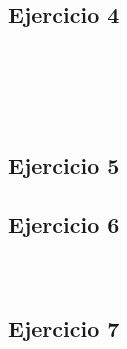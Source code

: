 \documentclass[10pt,a4paper]{article}
\begin{document}
\subsection{Ejercicio 4}
\subsubsection{}
    \begin{lstlisting}
    \end{lstlisting}
\subsubsection{}
    \begin{lstlisting}
    \end{lstlisting}
\subsubsection{}
    \begin{lstlisting}
    \end{lstlisting}
\subsubsection{}
    \begin{lstlisting}
    \end{lstlisting}
\subsection{Ejercicio 5}
\subsection{Ejercicio 6}
\subsubsection{}
    \begin{lstlisting}
    \end{lstlisting}
\subsubsection{}
    \begin{lstlisting}
    \end{lstlisting}
\subsection{Ejercicio 7}
\subsubsection{}
    \begin{lstlisting}
    \end{lstlisting}
\end{document}
